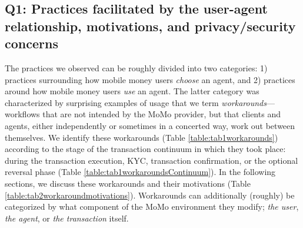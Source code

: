 \subsection{Q1: Practices facilitated by the user-agent relationship, motivations, and privacy/security concerns}
\label{sec:habitsandpractices} 
The practices we observed can be roughly divided into two categories: 1) practices surrounding how mobile money users \textit{choose} an agent, and 2) practices around how mobile money users \textit{use} an agent. 
The latter category was characterized by surprising examples of usage that we term \textit{workarounds}---workflows that are not intended by the MoMo provider, but that clients and agents, either independently or sometimes in a concerted way, work out between themselves. We identify these workarounds (Table \ref{table:tab1workarounds}) according to the stage of the transaction continuum in which they took place:  during the transaction execution, KYC, transaction confirmation, or the optional reversal phase (Table \ref{table:tab1workaroundsContinuum}). In the following sections, we discuss these workarounds and their motivations (Table \ref{table:tab2workaroundmotivations}). Workarounds can additionally (roughly) be categorized by what component of the MoMo environment they modify; \textit{the user}, \textit{the agent}, or \textit{the transaction} itself.  

